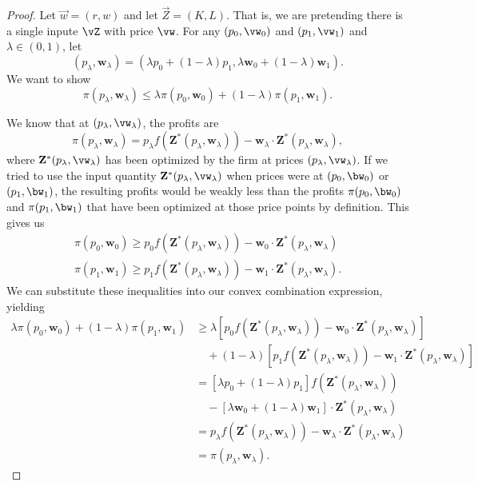 \begin{proof}
Let $\vec{w} = (r, w)$ and let $\vec{Z} = (K, L)$. That is, we are pretending there is a single inpute $\vZ$ with price $\vw$. For any $(p_0, \vw_0)$ and $(p_1, \vw_1)$ and $\lambda \in (0, 1)$, let 
$$\left(p_{\lambda}, \mathbf{w}_{\lambda}\right)=\left(\lambda p_{0}+(1-\lambda) p_{1}, \lambda \mathbf{w}_{0}+(1-\lambda) \mathbf{w}_{1}\right).$$
We want to show 
$$\pi\left(p_{\lambda}, \mathbf{w}_{\lambda}\right) \leq \lambda \pi\left(p_{0}, \mathbf{w}_{0}\right)+(1-\lambda) \pi\left(p_{1}, \mathbf{w}_{1}\right).$$

We know that at $(p_\lambda, \vw_\lambda)$, the profits are
$$\pi\left(p_{\lambda}, \mathbf{w}_{\lambda}\right)=p_{\lambda} f\left(\mathbf{Z}^{*}\left(p_{\lambda}, \mathbf{w}_{\lambda}\right)\right)-\mathbf{w}_{\lambda} \cdot \mathbf{Z}^{*}\left(p_{\lambda}, \mathbf{w}_{\lambda}\right),$$
where $\mathbf{Z}^{*}(p_\lambda, \vw_\lambda)$ has been optimized by the firm at prices $(p_\lambda, \vw_\lambda)$. If we tried to use the input quantity $\mathbf{Z}^{*}(p_\lambda, \vw_\lambda)$ when prices were at $(p_0, \bw_0)$ or $(p_1, \bw_1)$, the resulting profits would be weakly less than the profits $\pi(p_0, \bw_0)$ and $\pi(p_1, \bw_1)$ that have been optimized at those price points by definition. This gives us 
$$\begin{array}{l}
\pi\left(p_{0}, \mathbf{w}_{0}\right) \geq p_{0} f\left(\mathbf{Z}^{*}\left(p_{\lambda}, \mathbf{w}_{\lambda}\right)\right)-\mathbf{w}_{0} \cdot \mathbf{Z}^{*}\left(p_{\lambda}, \mathbf{w}_{\lambda}\right) \\
\pi\left(p_{1}, \mathbf{w}_{1}\right) \geq p_{1} f\left(\mathbf{Z}^{*}\left(p_{\lambda}, \mathbf{w}_{\lambda}\right)\right)-\mathbf{w}_{1} \cdot \mathbf{Z}^{*}\left(p_{\lambda}, \mathbf{w}_{\lambda}\right).
\end{array}
$$
We can substitute these inequalities into our convex combination expression, yielding
\begin{align*}
\lambda \pi\left(p_{0}, \mathbf{w}_{0}\right)+(1-\lambda) \pi\left(p_{1}, \mathbf{w}_{1}\right)
&\geq \lambda\left[p_{0} f\left(\mathbf{Z}^{*}\left(p_{\lambda}, \mathbf{w}_{\lambda}\right)\right)-\mathbf{w}_{0} \cdot \mathbf{Z}^{*}\left(p_{\lambda}, \mathbf{w}_{\lambda}\right)\right] \\
& \quad +(1-\lambda)\left[p_{1} f\left(\mathbf{Z}^{*}\left(p_{\lambda}, \mathbf{w}_{\lambda}\right)\right)-\mathbf{w}_{1} \cdot \mathbf{Z}^{*}\left(p_{\lambda}, \mathbf{w}_{\lambda}\right)\right] \\
&=\left[\lambda p_{0}+(1-\lambda) p_{1}\right] f\left(\mathbf{Z}^{*}\left(p_{\lambda}, \mathbf{w}_{\lambda}\right)\right) \\
&\quad -\left[\lambda \mathbf{w}_{0}+(1-\lambda) \mathbf{w}_{1}\right] \cdot \mathbf{Z}^{*}\left(p_{\lambda}, \mathbf{w}_{\lambda}\right) \\
&=p_{\lambda} f\left(\mathbf{Z}^{*}\left(p_{\lambda}, \mathbf{w}_{\lambda}\right)\right)-\mathbf{w}_{\lambda} \cdot \mathbf{Z}^{*}\left(p_{\lambda}, \mathbf{w}_{\lambda}\right) \\
&=\pi\left(p_{\lambda}, \mathbf{w}_{\lambda}\right).
\end{align*}
\end{proof}
